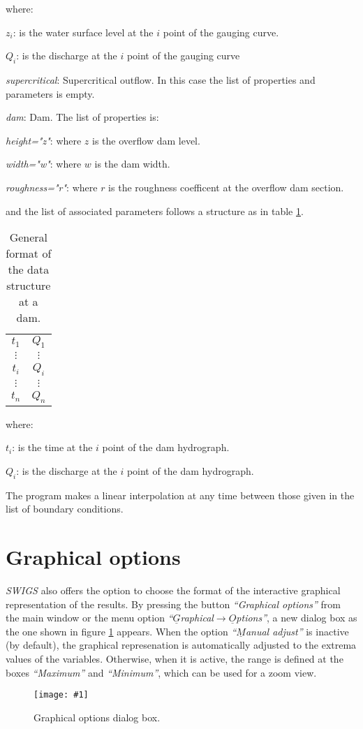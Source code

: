 \documentclass[a4paper,12pt]{article}
\newcommand{\fig}[3]
{
	\begin{figure}[ht!]
		\centering
		\texttt{[image: \#1]}
		\caption{#2.\label{#3}}
	\end{figure}
}
\newcommand{\TABLE}[4]
{
	\begin{table}[ht!]\centering
	\begin{tabular}{#1}\hline#2\\\hline\end{tabular}
	\caption{#3.\label{#4}}\end{table}
}
\newcommand{\swigs}{\emph{SWIGS}}
\newcommand{\IT}[1]{{\sl ``#1''}}
\begin{document}
\begin{description}
where:
\begin{description}
\item $z_i$: is the water surface level at the $i$ point of the gauging curve.
\item $Q_i$: is the discharge at the $i$ point of the gauging curve
\end{description}
\item\emph{supercritical}: Supercritical outflow. In this case the list of properties and parameters is empty.
\item\emph{dam}: Dam. The list of properties is:
\begin{description}
\item\emph{height="z"}: where $z$ is the overflow dam level.
\item\emph{width="w"}: where $w$ is the dam width.
\item\emph{roughness="r"}: where $r$ is the roughness coefficent at the overflow dam section.
\end{description}
and the list of associated parameters follows a structure as in table \ref{TabCCdam}.
\TABLE{cc}
{
	$t_1$&$Q_1$\\$\vdots$&$\vdots$\\
	$t_i$&$Q_i$\\$\vdots$&$\vdots$\\
	$t_n$&$Q_n$
}{General format of the data structure at a dam}{TabCCdam}

where:
\begin{description}
\item $t_i$: is the time at the $i$ point of the dam hydrograph.
\item $Q_i$: is the discharge at the $i$ point of the dam hydrograph.
\end{description}
\end{description}

The program makes a linear interpolation at any time between those given in the
list of boundary conditions.

\section{Graphical options}

{\swigs} also offers the option to choose the format of the interactive
graphical representation of the results. By pressing the button \IT{Graphical
options} from the main window or the menu option
\IT{$\underline{G}$raphical$\rightarrow\underline{O}$ptions}, a new dialog box as
the one shown in figure \ref{FigOpcionesA} appears. When the option
\IT{$\underline{M}$anual adjust} is inactive (by default), the graphical
represenation is automatically adjusted to the extrema values of the variables.
Otherwise, when it is active, the range is defined at the boxes \IT{Maximum} and
\IT{Minimum}, which can be used for a zoom view.
\fig{Options.ps}{Graphical options dialog box}{FigOpcionesA}
\end{document}
